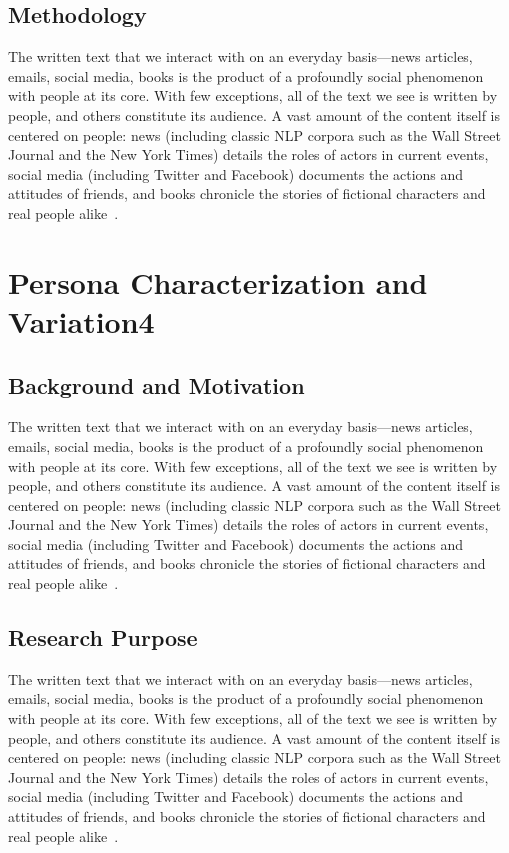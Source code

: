 \documentclass[11pt]{article}
\renewcommand\cite{\citep}  %
\begin{document}
\subsection{Methodology}
The written text that we interact with on an everyday basis—news articles, emails, social media, books is the product of a profoundly social phenomenon with people at its core. With few exceptions, all of the text we see is written by people, and others constitute its audience. A vast amount of the content itself is centered on people: news (including classic NLP corpora such as the Wall Street Journal and the New York Times) details the roles of actors in current events, social media (including Twitter and Facebook) documents
the actions and attitudes of friends, and books chronicle the stories of fictional characters and real people alike~\cite{serban2016building}.
\section{Persona Characterization and Variation4}
\subsection{Background and Motivation}
The written text that we interact with on an everyday basis—news articles, emails, social media, books is the product of a profoundly social phenomenon with people at its core. With few exceptions, all of the text we see is written by people, and others constitute its audience. A vast amount of the content itself is centered on people: news (including classic NLP corpora such as the Wall Street Journal and the New York Times) details the roles of actors in current events, social media (including Twitter and Facebook) documents
the actions and attitudes of friends, and books chronicle the stories of fictional characters and real people alike~\cite{serban2016building}.
\subsection{Research Purpose}
The written text that we interact with on an everyday basis—news articles, emails, social media, books is the product of a profoundly social phenomenon with people at its core. With few exceptions, all of the text we see is written by people, and others constitute its audience. A vast amount of the content itself is centered on people: news (including classic NLP corpora such as the Wall Street Journal and the New York Times) details the roles of actors in current events, social media (including Twitter and Facebook) documents
the actions and attitudes of friends, and books chronicle the stories of fictional characters and real people alike~\cite{serban2016building}.
\end{document}
